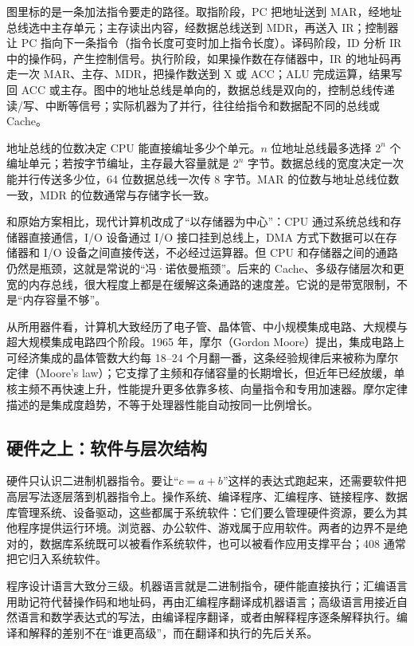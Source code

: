 图里标的是一条加法指令要走的路径。取指阶段，PC 把地址送到 MAR，经地址总线选中主存单元；主存读出内容，经数据总线送到 MDR，再送入 IR；控制器让 PC 指向下一条指令（指令长度可变时加上指令长度）。译码阶段，ID 分析 IR 中的操作码，产生控制信号。执行阶段，如果操作数在存储器中，IR 的地址码再走一次 MAR、主存、MDR，把操作数送到 X 或 ACC；ALU 完成运算，结果写回 ACC 或主存。图中的地址总线是单向的，数据总线是双向的，控制总线传递读/写、中断等信号；实际机器为了并行，往往给指令和数据配不同的总线或 Cache。

\begin{attention}
地址总线的位数决定 CPU 能直接编址多少个单元。$n$ 位地址总线最多选择 $2^n$ 个编址单元；若按字节编址，主存最大容量就是 $2^n$ 字节。数据总线的宽度决定一次能并行传送多少位，64 位数据总线一次传 8 字节。MAR 的位数与地址总线位数一致，MDR 的位数通常与存储字长一致。
\end{attention}

和原始方案相比，现代计算机改成了“以存储器为中心”：CPU 通过系统总线和存储器直接通信，I/O 设备通过 I/O 接口挂到总线上，DMA 方式下数据可以在存储器和 I/O 设备之间直接传送，不必经过运算器。但 CPU 和存储器之间的通路仍然是瓶颈，这就是常说的“冯·诺依曼瓶颈”。后来的 Cache、多级存储层次和更宽的内存总线，很大程度上都是在缓解这条通路的速度差。它说的是带宽限制，不是“内存容量不够”。

从所用器件看，计算机大致经历了电子管、晶体管、中小规模集成电路、大规模与超大规模集成电路四个阶段。1965 年，摩尔（Gordon Moore）提出，集成电路上可经济集成的晶体管数大约每 18--24 个月翻一番，这条经验规律后来被称为摩尔定律（Moore's law）；它支撑了主频和存储容量的长期增长，但近年已经放缓，单核主频不再快速上升，性能提升更多依靠多核、向量指令和专用加速器。摩尔定律描述的是集成度趋势，不等于处理器性能自动按同一比例增长。

\subsection{硬件之上：软件与层次结构}

硬件只认识二进制机器指令。要让“$c=a+b$”这样的表达式跑起来，还需要软件把高层写法逐层落到机器指令上。操作系统、编译程序、汇编程序、链接程序、数据库管理系统、设备驱动，这些都属于系统软件：它们要么管理硬件资源，要么为其他程序提供运行环境。浏览器、办公软件、游戏属于应用软件。两者的边界不是绝对的，数据库系统既可以被看作系统软件，也可以被看作应用支撑平台；408 通常把它归入系统软件。

程序设计语言大致分三级。机器语言就是二进制指令，硬件能直接执行；汇编语言用助记符代替操作码和地址码，再由汇编程序翻译成机器语言；高级语言用接近自然语言和数学表达式的写法，由编译程序翻译，或者由解释程序逐条解释执行。编译和解释的差别不在“谁更高级”，而在翻译和执行的先后关系。

